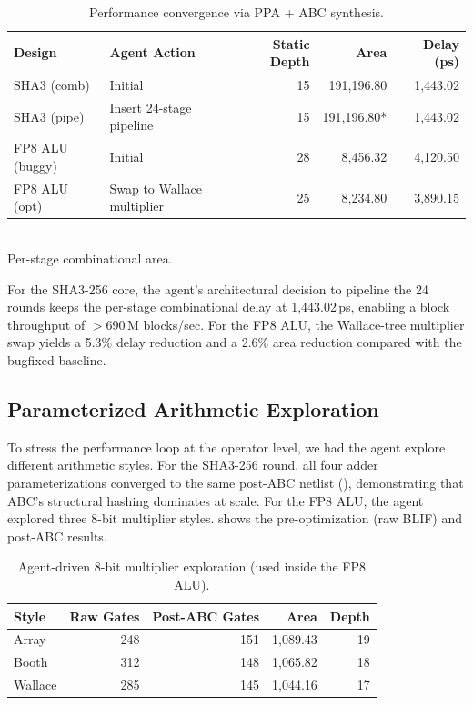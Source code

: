 \documentclass[11pt]{article}
\begin{document}
\begin{table}[htbp]
\centering
\caption{Performance convergence via PPA + ABC synthesis.}
\label{tab:perf_convergence}
\begin{tabular}{@{}llrrr@{}}
\toprule
\textbf{Design} & \textbf{Agent Action} & \textbf{Static Depth} & \textbf{Area} & \textbf{Delay (ps)} \\
\midrule
SHA3 (comb) & Initial & 15 & 191,196.80 & 1,443.02 \\
SHA3 (pipe) & Insert 24-stage pipeline & 15 & 191,196.80* & 1,443.02 \\
FP8 ALU (buggy) & Initial & 28 & 8,456.32 & 4,120.50 \\
FP8 ALU (opt) & Swap to Wallace multiplier & 25 & 8,234.80 & 3,890.15 \\
\bottomrule
\end{tabular}
\\{\small *Per-stage combinational area.}
\end{table}

For the SHA3-256 core, the agent's architectural decision to pipeline the 24 rounds keeps the per-stage combinational delay at 1,443.02\,ps, enabling a block throughput of $>$690\,M blocks/sec. For the FP8 ALU, the Wallace-tree multiplier swap yields a 5.3\% delay reduction and a 2.6\% area reduction compared with the bugfixed baseline.

\subsection{Parameterized Arithmetic Exploration}
\label{sec:exp_arith}

To stress the performance loop at the operator level, we had the agent explore different arithmetic styles. For the SHA3-256 round, all four adder parameterizations converged to the same post-ABC netlist (), demonstrating that ABC's structural hashing dominates at scale. For the FP8 ALU, the agent explored three 8-bit multiplier styles.  shows the pre-optimization (raw BLIF) and post-ABC results.

\begin{table}[htbp]
\centering
\caption{Agent-driven 8-bit multiplier exploration (used inside the FP8 ALU).}
\label{tab:mul_params}
\begin{tabular}{@{}lrrrr@{}}
\toprule
\textbf{Style} & \textbf{Raw Gates} & \textbf{Post-ABC Gates} & \textbf{Area} & \textbf{Depth} \\
\midrule
Array   & 248 & 151 & 1,089.43 & 19 \\
Booth   & 312 & 148 & 1,065.82 & 18 \\
Wallace & 285 & 145 & 1,044.16 & 17 \\
\bottomrule
\end{tabular}
\end{table}
\end{document}

